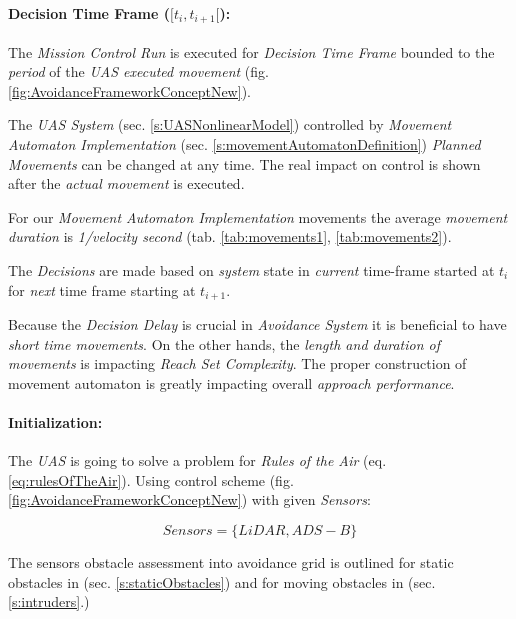\paragraph{Decision Time Frame ($[t_i,t_{i+1}[$):} The \emph{Mission Control Run} is executed for \emph{Decision Time Frame} bounded to the \emph{period} of the \emph{UAS executed movement} (fig. \ref{fig:AvoidanceFrameworkConceptNew}).

The \emph{UAS System} (sec. \ref{s:UASNonlinearModel}) controlled by \emph{Movement Automaton Implementation} (sec. \ref{s:movementAutomatonDefinition}) \emph{Planned Movements} can be changed at any time. The real impact on control is shown after the \emph{actual movement} is executed. 

\begin{note}
    For our \emph{Movement Automaton Implementation} movements the average \emph{movement duration} is \emph{1/velocity second} (tab. \ref{tab:movements1}, \ref{tab:movements2}).
\end{note}

The \emph{Decisions} are made based on \emph{system} state in \emph{current} time-frame started at $t_i$ for \emph{next} time frame starting at $t_{i+1}$.

\begin{note}
    Because the \emph{Decision Delay} is crucial in \emph{Avoidance System} it is beneficial to have \emph{short time movements}. On the other hands, the \emph{length and duration  of movements} is impacting \emph{Reach Set Complexity}. The proper construction of movement automaton is greatly impacting overall \emph{approach performance}.
\end{note}

\paragraph{Initialization:} The \emph{UAS} is going to solve a problem for \emph{Rules of the Air} (eq. \ref{eq:rulesOfTheAir}). Using control scheme (fig. \ref{fig:AvoidanceFrameworkConceptNew}) with given \emph{Sensors}:

\begin{equation}
    Sensors = \{LiDAR,ADS-B\}
\end{equation}

\noindent The sensors obstacle assessment into avoidance grid is outlined for static obstacles in (sec. \ref{s:staticObstacles}) and for moving obstacles in (sec. \ref{s:intruders}.)

